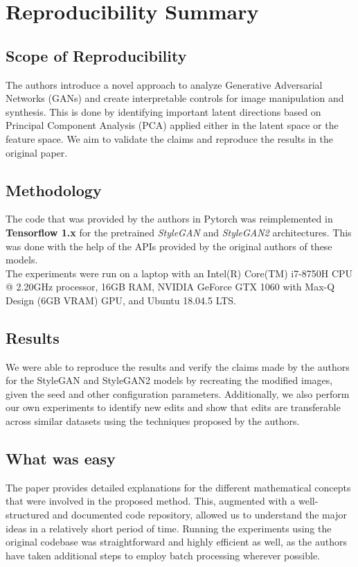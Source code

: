 \section*{\centering Reproducibility Summary}

\subsection*{Scope of Reproducibility}

The authors introduce a novel approach to analyze Generative Adversarial Networks (GANs) and create interpretable controls for image manipulation and synthesis. This is done by identifying important latent directions based on Principal Component Analysis (PCA) applied either in the latent space or the feature space. We aim to validate the claims and reproduce the results in the original paper.

\subsection*{Methodology}

The code that was provided by the authors in Pytorch was reimplemented in \textbf{Tensorflow 1.x} for the pretrained \textit{StyleGAN} and \textit{StyleGAN2} architectures. This was done with the help of the APIs provided by the original authors of these models.
\\
The experiments were run on a laptop with an Intel(R) Core(TM) i7-8750H CPU @ 2.20GHz processor, 16GB RAM, NVIDIA GeForce GTX 1060 with Max-Q Design (6GB VRAM) GPU, and Ubuntu 18.04.5 LTS.

\subsection*{Results}

We were able to reproduce the results and verify the claims made by the authors for the StyleGAN and StyleGAN2 models by recreating the modified images, given the seed and other configuration parameters.
Additionally, we also perform our own experiments to identify new edits and show that edits are transferable across similar datasets using the techniques proposed by the authors.

\subsection*{What was easy}

The paper provides detailed explanations for the different mathematical concepts that were involved in the proposed method. This, augmented with a well-structured and documented code repository, allowed us to understand the major ideas in a relatively short period of time. Running the experiments using the original codebase was straightforward and highly efficient as well, as the authors have taken additional steps to employ batch processing wherever possible.

